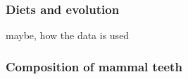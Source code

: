 \documentclass{article}
\begin{document}
\subsubsection{Diets and evolution}

maybe, how the data is used

\subsubsection{Composition of mammal teeth}






\end{document}
